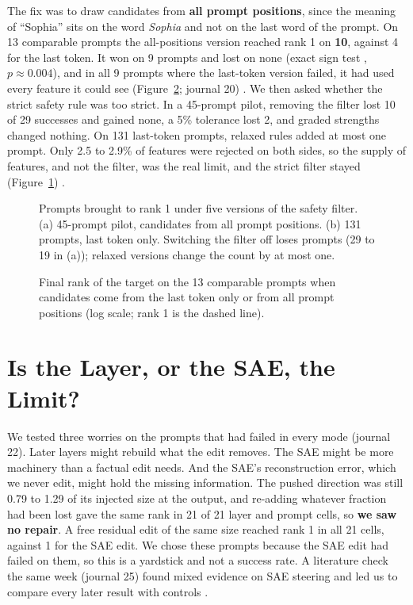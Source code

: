 The fix was to draw candidates from \textbf{all prompt positions}, since the meaning of ``Sophia'' sits on the word \emph{Sophia} and not on the last word of the prompt. On 13 comparable prompts the all-positions version reached rank 1 on \textbf{10}, against 4 for the last token. It won on 9 prompts and lost on none (exact sign test \cite{r56}, $p\approx0.004$), and in all 9 prompts where the last-token version failed, it had used every feature it could see (Figure~\ref{fig:candsrc}; journal 20) \cite{p7}. We then asked whether the strict safety rule was too strict. In a 45-prompt pilot, removing the filter lost 10 of 29 successes and gained none, a 5\% tolerance lost 2, and graded strengths changed nothing. On 131 last-token prompts, relaxed rules added at most one prompt. Only 2.5 to 2.9\% of features were rejected on both sides, so the supply of features, and not the filter, was the real limit, and the strict filter stayed (Figure~\ref{fig:filter}) \cite{p8}.

\begin{figure}[!htb]
\centering
{}
\caption{Prompts brought to rank 1 under five versions of the safety filter. (a) 45-prompt pilot, candidates from all prompt positions. (b) 131 prompts, last token only. Switching the filter off loses prompts (29 to 19 in (a)); relaxed versions change the count by at most one.}\label{fig:filter}
\end{figure}


\begin{figure}[!htb]
\centering
{}
\caption{Final rank of the target on the 13 comparable prompts when candidates come from the last token only or from all prompt positions (log scale; rank 1 is the dashed line).}\label{fig:candsrc}
\end{figure}

\section{Is the Layer, or the SAE, the Limit?}\label{sec:repair}

We tested three worries on the prompts that had failed in every mode (journal 22). Later layers might rebuild what the edit removes. The SAE might be more machinery than a factual edit needs. And the SAE's reconstruction error, which we never edit, might hold the missing information. The pushed direction was still 0.79 to 1.29 of its injected size at the output, and re-adding whatever fraction had been lost gave the same rank in 21 of 21 layer and prompt cells, so \textbf{we saw no repair}. A free residual edit of the same size reached rank 1 in all 21 cells, against 1 for the SAE edit. We chose these prompts because the SAE edit had failed on them, so this is a yardstick and not a success rate. A literature check the same week (journal 25) found mixed evidence on SAE steering and led us to compare every later result with controls \cite{p9,p11}.


